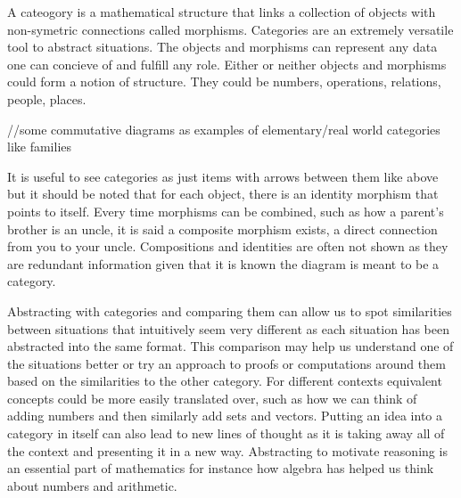 A cateogory is a mathematical structure that links a collection of objects
with non-symetric connections called morphisms.  Categories are an
extremely versatile tool to abstract situations.  The objects and morphisms
can represent any data one can concieve of and fulfill any role.  Either or
neither objects and morphisms could form a notion of structure.  They could
be numbers, operations, relations, people, places.

//some commutative diagrams as examples of elementary/real world categories
like families

It is useful to see categories as just items with arrows between them like
above but it should be noted that for each object, there is an identity
morphism that points to itself.  Every time morphisms can be combined, such
as how a parent's brother is an uncle, it is said a composite morphism
exists, a direct connection from you to your uncle.  Compositions and
identities are often not shown as they are redundant information given that
it is known the diagram is meant to be a category.

Abstracting with categories and comparing them can allow us to spot
similarities between situations that intuitively seem very different as
each situation has been abstracted into the same format.  This comparison
may help us understand one of the situations better or try an approach to
proofs or computations around them based on the similarities to the other
category.  For different contexts equivalent concepts could be more easily
translated over, such as how we can think of adding numbers and then
similarly add sets and vectors.  Putting an idea into a category in itself
can also lead to new lines of thought as it is taking away all of the
context and presenting it in a new way.  Abstracting to motivate reasoning
is an essential part of mathematics for instance how algebra has helped us
think about numbers and arithmetic.
